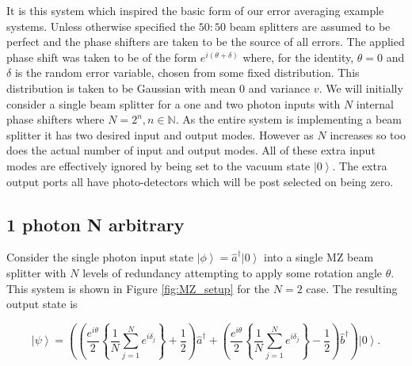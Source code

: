 \documentclass[aps,pra,twocolumn,superscriptaddress,numerical]{revtex4-1}
\begin{document}
	It is this system which inspired the basic form of our error averaging example systems. Unless otherwise specified the $50:50$ beam splitters are assumed to be perfect and the phase shifters are taken to be the source of all errors. The applied phase shift was taken to be of the form $e^{i(\theta+\delta)}$ where, for the identity, $\theta=0$ and $\delta$ is the random error variable, chosen from some fixed distribution. This distribution is taken to be Gaussian with mean $0$ and variance $v$. We will initially consider a single beam splitter for a one and two photon inputs with $N$ internal phase shifters where $N=2^{n},n\in\mathbb{N}$. As the entire system is implementing a beam splitter it has two desired input and output modes. However as $N$ increases so too does the actual number of input and output modes. All of these extra input modes are effectively ignored by being set to the vacuum state $\left|0\right\rangle $. The extra output ports all have photo-detectors which will be post selected on being zero.
		
	
	\subsection{1 photon N arbitrary \label{1 photon N arbitrary}}
	
		Consider the single photon input state $\left|\phi\right\rangle = \hat{a}^{\dagger}\left|0\right\rangle $ into a single MZ beam splitter with $N$ levels of redundancy attempting to apply some rotation angle $\theta$. This system is shown in Figure \ref{fig:MZ_setup} for the $N=2$ case. The resulting output state is
		
		\begin{widetext}
			\begin{equation}
				\left|\psi\right\rangle =\left(\left(\frac{e^{i\theta}}{2}\left\{ 	\frac{1}{N}\sum_{j=1}^{N}e^{i\delta_{j}}\right\} +\frac{1}{2}\right)\hat{a}^{\dagger}+\left(\frac{e^{i\theta}}{2}\left\{ \frac{1}{N}\sum_{j=1}^{N}e^{i\delta_{j}}\right\} -\frac{1}{2}\right)\hat{b}^{\dagger}\right)\left|0\right\rangle .\label{eq:1ParbN}
			\end{equation}
		\end{widetext}
	
\end{document}
